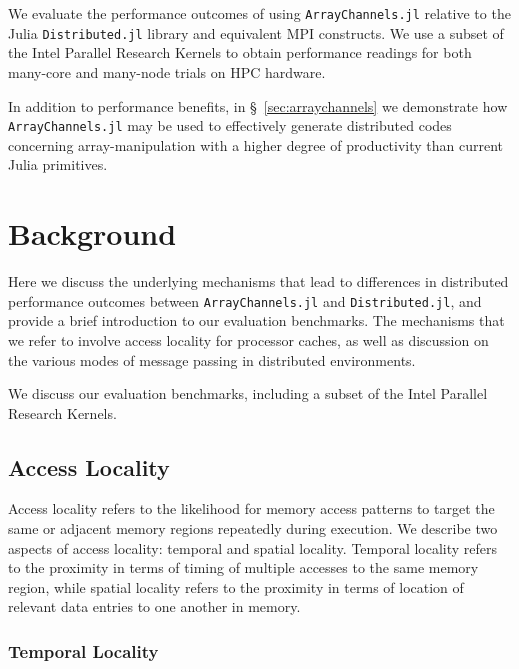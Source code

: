 \documentclass{juliacon}
\begin{document}
We evaluate the performance outcomes of using \texttt{ArrayChannels.jl}
relative to the Julia \texttt{Distributed.jl} library and
equivalent MPI constructs. We use a subset of the Intel
Parallel Research Kernels to obtain performance readings for both
many-core and many-node trials on HPC hardware.

In addition to performance benefits, in \S~\ref{sec:arraychannels}
we demonstrate how \texttt{ArrayChannels.jl} may be used to effectively
generate distributed codes concerning array-manipulation with a higher
degree of productivity than current Julia primitives.


\section{Background}
Here we discuss the underlying mechanisms that lead to differences in
distributed performance outcomes between \texttt{ArrayChannels.jl} and
\texttt{Distributed.jl}, and provide a brief introduction to our
evaluation benchmarks. The mechanisms that we refer to involve access
locality for processor caches, as well as discussion on the various
modes of message passing in distributed environments.

We discuss our evaluation benchmarks, including a subset of the Intel
Parallel Research Kernels.

\subsection{Access Locality}
\label{sec:access-locality}

Access locality \cite{patterns} refers to the likelihood for memory access patterns to target the same or adjacent memory regions repeatedly during execution. We describe two aspects of access locality: temporal and spatial locality. Temporal locality refers to the proximity in terms of timing of multiple accesses to the same memory region, while spatial locality
refers to the proximity in terms of location of relevant data entries to one another in memory.

\subsubsection{Temporal Locality}
\label{sec:temporal-locality}
\end{document}
